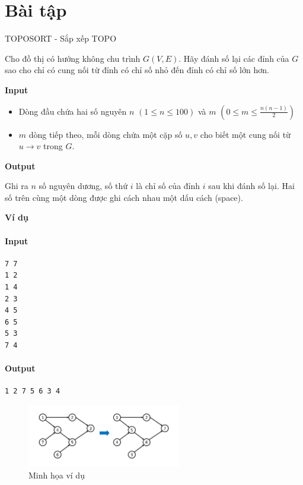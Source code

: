 \section{Bài tập}
\begin{baitap}{TOPOSORT - Sắp xếp TOPO}{}
    
Cho đồ thị có hướng không chu trình $G(V, E)$. Hãy đánh số lại các đỉnh của $G$ sao cho chỉ có cung nối từ đỉnh có chỉ số nhỏ đến đỉnh có chỉ số lớn hơn.

\textbf{Input}

\begin{itemize}
    \item Dòng đầu chứa hai số nguyên $n$ $(1 \leq n \leq 100)$ và $m$ $(0 \leq m \leq \frac{n(n-1)}{2})$
    \item $m$ dòng tiếp theo, mỗi dòng chứa một cặp số $u, v$ cho biết một cung nối từ $u \rightarrow v$ trong $G$.
\end{itemize}

\textbf{Output}

Ghi ra $n$ số nguyên dương, số thứ $i$ là chỉ số của đỉnh $i$ sau khi đánh số lại. Hai số trên cùng một dòng được ghi cách nhau một dấu cách (space).

\textbf{Ví dụ}

\paragraph{Input}
\begin{lstlisting}
7 7
1 2
1 4
2 3
4 5
6 5
5 3
7 4 
\end{lstlisting}

\paragraph{Output}
\begin{lstlisting}
1 2 7 5 6 3 4
\end{lstlisting}

\begin{figure}[H]
    \centering
    \includegraphics[width=0.6\textwidth]{resource/img/b2/topological_sort_img3.png}
    \caption{Minh họa ví dụ}
\end{figure}

\end{baitap}

